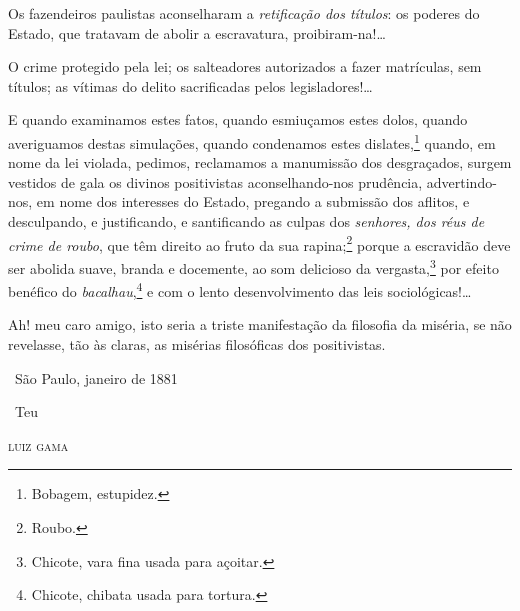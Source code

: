 Os fazendeiros paulistas aconselharam a \emph{retificação dos títulos}:
os poderes do Estado, que tratavam de abolir a escravatura,
proibiram-na!\ldots{}

O crime protegido pela lei; os salteadores autorizados a fazer
matrículas, sem títulos; as vítimas do delito sacrificadas pelos
legisladores!\ldots{}

E quando examinamos estes fatos, quando esmiuçamos estes dolos, quando
averiguamos destas simulações, quando condenamos estes
dislates,\footnote{Bobagem, estupidez.} quando, em nome da lei
violada, pedimos, reclamamos a manumissão dos desgraçados, surgem
vestidos de gala os divinos positivistas aconselhando-nos prudência,
advertindo-nos, em nome dos interesses do Estado, pregando a submissão
dos aflitos, e desculpando, e justificando, e santificando as culpas dos
\emph{senhores, dos réus de crime de roubo}, que têm direito ao fruto da
sua rapina;\footnote{Roubo.} porque a escravidão deve ser abolida
suave, branda e docemente, ao som delicioso da vergasta,\footnote{
  Chicote, vara fina usada para açoitar.} por efeito benéfico do
\emph{bacalhau},\footnote{Chicote, chibata usada para tortura.}
e com o lento
desenvolvimento das leis sociológicas!\ldots{}

Ah! meu caro amigo, isto seria a triste manifestação da filosofia da
miséria, se não revelasse, tão às claras, as misérias filosóficas dos
positivistas.

\medskip

\hfill\ São Paulo, janeiro de 1881

\hfill\ Teu

\hfill\textsc{luiz gama}



